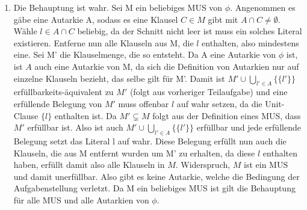 \documentclass[a4paper,10pt]{article}
\begin{document}
\begin{enumerate}
\item Die Behauptung ist wahr. Sei M ein beliebiges MUS von $\phi$. Angenommen es gäbe eine Autarkie A, sodass es eine Klausel $C \in M$ gibt mit $A \cap C \neq \emptyset$. Wähle $l \in A \cap C$ beliebig, da der Schnitt nicht leer ist muss ein solches Literal existieren. Entferne nun alle Klauseln aus M, die $l$ enthalten, also mindestens eine. Sei M' die Klauselmenge, die so entsteht. Da A eine Autarkie von $\phi$ ist, ist $A$ auch eine Autarkie von M, da sich die Definition von Autarkien nur auf einzelne Klauseln bezieht, das selbe gilt für M'. Damit ist $M' \cup \bigcup_{l' \in A} \{\{l'\}\}$ erfüllbarkeits-äquivalent zu $M'$ (folgt aus vorheriger Teilaufgabe) und eine erfüllende Belegung von $M'$ muss offenbar $l$ auf wahr setzen, da die Unit-Clause $\{l\}$ enthalten ist. Da $M' \subsetneq M$ folgt aus der Definition eines MUS, dass $M'$ erfüllbar ist. Also ist auch $M'  \cup \bigcup_{l' \in A} \{\{l'\}\}$ erfüllbar und jede erfüllende Belegung setzt das Literal l auf wahr. Diese Belegung erfüllt nun auch die Klauseln, die aus M entfernt wurden um M' zu erhalten, da diese $l$ enthalten haben, erfüllt damit also alle Klauseln in $M$. Widerspruch, $M$ ist ein MUS und damit unerfüllbar. Also gibt es keine Autarkie, welche die Bedingung der Aufgabenstellung verletzt. Da M ein beliebiges MUS ist gilt die Behauptung für alle MUS und alle Autarkien von $\phi$.
\end{enumerate}
\end{document}

